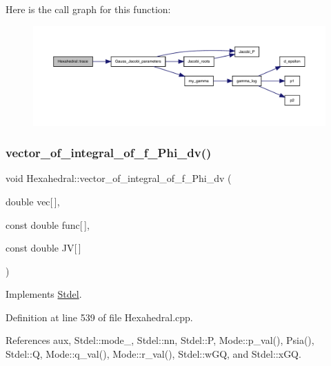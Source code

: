 Here is the call graph for this function\+:
\nopagebreak
\begin{figure}[H]
\begin{center}
\leavevmode
\includegraphics[width=350pt]{classHexahedral_a19ff3c9bf760964284ee86ad06c795d6_cgraph}
\end{center}
\end{figure}
\mbox{\label{classHexahedral_a22d3f788ce0bdf8209c800282868b8c1}} 
\subsubsection{\texorpdfstring{vector\+\_\+of\+\_\+integral\+\_\+of\+\_\+f\+\_\+\+Phi\+\_\+dv()}{vector\_of\_integral\_of\_f\_Phi\_dv()}\hspace{0.1cm}{\footnotesize\ttfamily [1/2]}}
{\footnotesize\ttfamily void Hexahedral\+::vector\+\_\+of\+\_\+integral\+\_\+of\+\_\+f\+\_\+\+Phi\+\_\+dv (\begin{DoxyParamCaption}\item[{double}]{vec\mbox{[}$\,$\mbox{]},  }\item[{const double}]{func\mbox{[}$\,$\mbox{]},  }\item[{const double}]{JV\mbox{[}$\,$\mbox{]} }\end{DoxyParamCaption})\hspace{0.3cm}{\ttfamily [virtual]}}



Implements \hyperlink{classStdel_aa5ef347c02106753c2d3961b59a7309e}{Stdel}.



Definition at line 539 of file Hexahedral.\+cpp.



References aux, Stdel\+::mode\+\_\+, Stdel\+::nn, Stdel\+::P, Mode\+::p\+\_\+val(), Psia(), Stdel\+::Q, Mode\+::q\+\_\+val(), Mode\+::r\+\_\+val(), Stdel\+::w\+GQ, and Stdel\+::x\+GQ.

